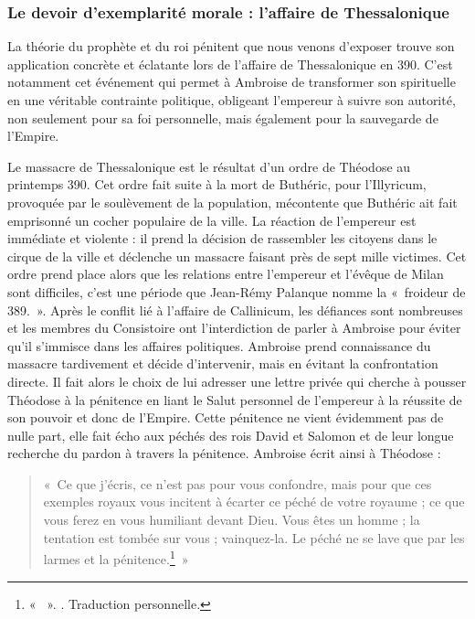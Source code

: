 \bigskip

\subsubsection{Le devoir d'exemplarité morale : l'affaire de Thessalonique}

La théorie du prophète et du roi pénitent que nous venons d'exposer trouve son application concrète et éclatante lors de l'affaire de Thessalonique en 390. C'est notamment cet événement qui permet à Ambroise de transformer son  spirituelle en une véritable contrainte politique, obligeant l'empereur à suivre son autorité, non seulement pour sa foi personnelle, mais également pour la sauvegarde de l'Empire.

\bigskip

Le massacre de Thessalonique est le résultat d'un ordre de Théodose au printemps 390. Cet ordre fait suite à la mort de Buthéric,  pour l'Illyricum, provoquée par le soulèvement de la population, mécontente que Buthéric ait fait emprisonné un cocher populaire de la ville. La réaction de l'empereur est immédiate et violente : il prend la décision de rassembler les citoyens dans le cirque de la ville et déclenche un massacre faisant près de sept mille victimes. Cet ordre prend place alors que les relations entre l'empereur et l'évêque de Milan sont difficiles, c'est une période que Jean-Rémy Palanque nomme la «~froideur de 389\autocite[223]{palanque_ambroise}.~». Après le conflit lié à l'affaire de Callinicum, les défiances sont nombreuses et les membres du Consistoire ont l'interdiction de parler à Ambroise pour éviter qu'il s'immisce dans les affaires politiques. Ambroise prend connaissance du massacre tardivement et décide d'intervenir, mais en évitant la confrontation directe. Il fait alors le choix de lui adresser une lettre privée qui cherche à pousser Théodose à la pénitence en liant le Salut personnel de l'empereur à la réussite de son pouvoir et donc de l'Empire. Cette pénitence ne vient évidemment pas de nulle part, elle fait écho aux péchés des rois David et Salomon et de leur longue recherche du pardon à travers la pénitence. Ambroise écrit ainsi à Théodose :

\bigskip

\begin{quote}
    «~Ce que j’écris, ce n’est pas pour vous confondre, mais pour que ces exemples royaux vous incitent à écarter ce péché de votre royaume ; ce que vous ferez en vous humiliant devant Dieu. Vous êtes un homme ; la tentation est tombée sur vous ; vainquez-la. Le péché ne se lave que par les larmes et la pénitence.\footnote{« ~». \cite[\nopp ec 11, 11]{ambroise_csel_82_3}. Traduction personnelle.}~»
\end{quote}

